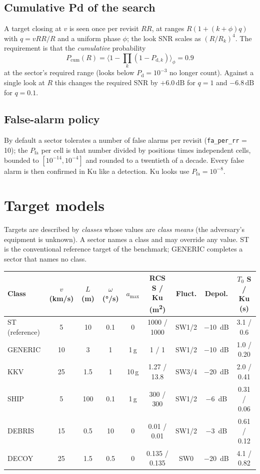 \documentclass[11pt,a4paper]{article}
\newcommand{\code}[1]{\texttt{\small #1}}
\newcommand{\dB}{\,\mathrm{dB}}
\newcommand{\Pd}{P_{\mathrm d}}
\newcommand{\Pfa}{P_{\mathrm{fa}}}
\begin{document}
\subsection{Cumulative Pd of the search}
A target closing at $v$ is seen once per revisit $RR$, at ranges $R(1+(k+\phi)q)$ with $q = vRR/R$ and a uniform phase
$\phi$; the look SNR scales as $(R/R_k)^4$. The requirement is that the \emph{cumulative} probability
\[
  P_{\mathrm{cum}}(R) = \bigl\langle 1 - \textstyle\prod_k (1 - P_{\mathrm{d},k})\bigr\rangle_\phi = 0.9
\]
at the sector's required range (looks below $\Pd = 10^{-3}$ no longer count). Against a single look at $R$ this changes
the required SNR by $+6.0\dB$ for $q=1$ and $-6.8\dB$ for $q=0.1$.

\subsection{False-alarm policy}
By default a sector tolerates a number of false alarms per revisit (\code{fa\_per\_rr} = 10); the $\Pfa$ per cell is
that number divided by positions times independent cells, bounded to $[10^{-14}, 10^{-4}]$ and rounded to a twentieth
of a decade. Every false alarm is then confirmed in Ku like a detection. Ku looks use $\Pfa = 10^{-8}$.

\section{Target models}\label{sec:targets}
Targets are described by \emph{classes} whose values are \emph{class means} (the adversary's equipment is unknown). A sector names a class and may
override any value. ST is the conventional reference target of the benchmark; GENERIC completes a sector that names no
class.

\begin{center}
{\small\setlength{\tabcolsep}{4pt}\begin{tabular}{@{}lcccccccc@{}}
\toprule
Class & $v$ (km/s) & $L$ (m) & $\omega$ (\si{\degree/s}) & $a_{\max}$ & RCS S / Ku (\si{m^2}) & Fluct. & Depol. & $T_0$ S / Ku (s)\\
\midrule
ST (reference) & 5 & 10 & 0.1 & 0 & \num{1000} / \num{1000} & SW1/2 & \SI{-10}{dB} & 3.1 / 0.6\\
GENERIC & 10 & 3 & 1 & 1\,g & 1 / 1 & SW1/2 & \SI{-10}{dB} & 1.0 / 0.20\\
KKV & 25 & 1.5 & 1 & 10\,g & 1.27 / 13.8 & SW3/4 & \SI{-20}{dB} & 2.0 / 0.41\\
SHIP & 5 & 100 & 0.1 & 1\,g & 300 / 300 & SW1/2 & \SI{-6}{dB} & 0.31 / 0.06\\
DEBRIS & 15 & 0.5 & 10 & 0 & 0.01 / 0.01 & SW1/2 & \SI{-3}{dB} & 0.61 / 0.12\\
DECOY & 25 & 1.5 & 0.5 & 0 & 0.135 / 0.135 & SW0 & \SI{-20}{dB} & 4.1 / 0.82\\
\bottomrule
\end{tabular}}
\end{center}
\end{document}

